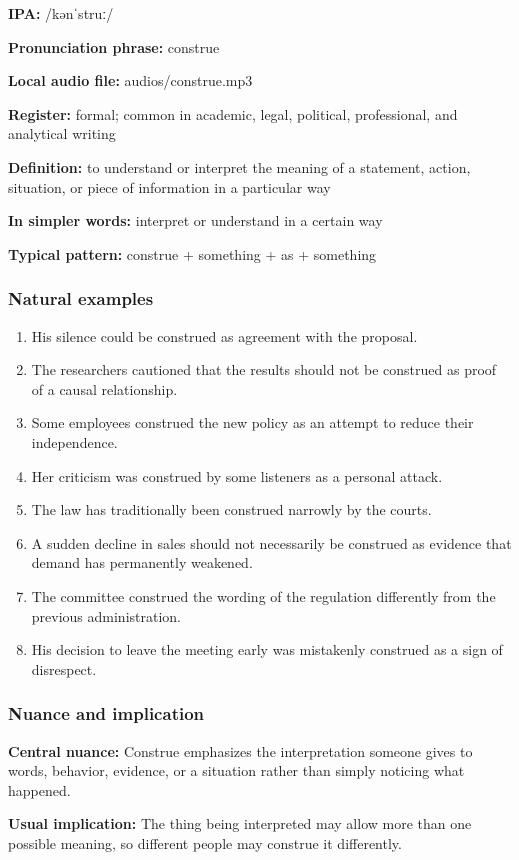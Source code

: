 \documentclass[11pt]{article}
\begin{document}
\textbf{IPA:} /kənˈstruː/

\textbf{Pronunciation phrase:} construe

\textbf{Local audio file:} audios/construe.mp3

\textbf{Register:} formal; common in academic, legal, political, professional, and analytical writing

\textbf{Definition:} to understand or interpret the meaning of a statement, action, situation, or piece of information in a particular way

\textbf{In simpler words:} interpret or understand in a certain way

\textbf{Typical pattern:} construe + something + as + something

\subsubsection{Natural examples}
\begin{enumerate}
  \item His silence could be construed as agreement with the proposal.
  \item The researchers cautioned that the results should not be construed as proof of a causal relationship.
  \item Some employees construed the new policy as an attempt to reduce their independence.
  \item Her criticism was construed by some listeners as a personal attack.
  \item The law has traditionally been construed narrowly by the courts.
  \item A sudden decline in sales should not necessarily be construed as evidence that demand has permanently weakened.
  \item The committee construed the wording of the regulation differently from the previous administration.
  \item His decision to leave the meeting early was mistakenly construed as a sign of disrespect.
\end{enumerate}

\subsubsection{Nuance and implication}
\textbf{Central nuance:} Construe emphasizes the interpretation someone gives to words, behavior, evidence, or a situation rather than simply noticing what happened.

\textbf{Usual implication:} The thing being interpreted may allow more than one possible meaning, so different people may construe it differently.
\end{document}
